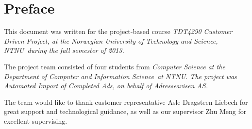 \section*{Preface}
This document was written for the project-based course \em TDT4290 Customer Driven Project\em, at the \em Norwegian University of Technology and Science, NTNU\em \ during the fall semester of 2013.

The project team consisted of four students from \em Computer Science \em  at the \em Department of Computer and Information Science\em \ at \em NTNU\em. The project was \em Automated Import of Completed Ads\em, on behalf of \em Adresseavisen AS\em.

The team would like to thank customer representative Asle Dragsteen Liebech for great support and technological guidance, as well as our supervisor Zhu Meng for excellent supervising.